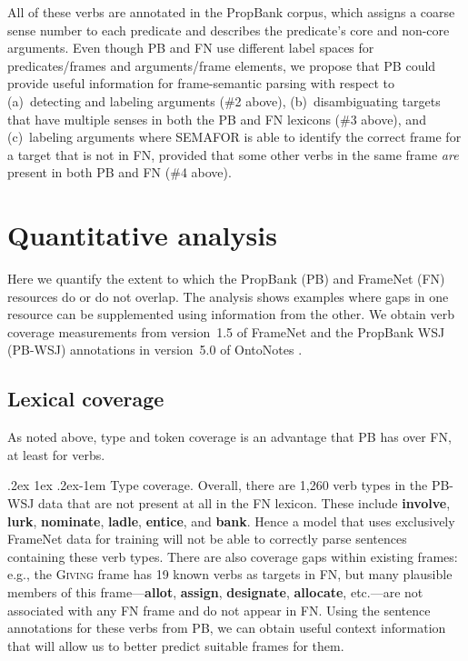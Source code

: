 \documentclass[11pt]{article}
\makeatletter
\renewcommand{\paragraph}{%
  \@startsection{paragraph}{4}%
  {\z@}{.2ex \@plus 1ex \@minus .2ex}{-1em}%
  {\normalfont\normalsize\bfseries}%
}
\newcommand{\vpred}[1]{\textbf{#1}} %
\newcommand{\fname}[1]{\textsc{#1}} %
\makeatother
\begin{document}
All of these verbs are annotated in the PropBank corpus, which assigns a coarse sense number 
to each predicate and describes the predicate's core and non-core arguments. 
Even though PB and FN use different label spaces for predicates/frames and 
arguments/frame elements, we propose that PB could provide useful information for frame-semantic parsing 
with respect to (a)~detecting and labeling arguments (\#2 above),  
(b)~disambiguating targets that have multiple senses in both the PB and FN lexicons (\#3 above), and
(c)~labeling arguments where SEMAFOR is able to identify the correct frame for a target that is not in FN, 
provided that some other verbs in the same frame \emph{are} present in both PB and FN (\#4 above).


\section{Quantitative analysis}\label{sec:quant}

Here we quantify the extent to which the PropBank (PB) and FrameNet (FN) resources 
do or do not overlap. The analysis shows examples where gaps in one resource can be supplemented using information from the other. We obtain verb coverage measurements from version~1.5 of FrameNet 
and the PropBank WSJ (PB-WSJ) annotations in version~5.0 of OntoNotes \citep{ontonotes}. 

\subsection{Lexical coverage}\label{sec:coverage}


As noted above, type and token coverage is an advantage that PB has over FN, at least for verbs.

\paragraph{Type coverage.}
Overall, there are 1,260 verb types in the PB-WSJ data that are not present at all in the FN lexicon. 
These include \vpred{involve}, \vpred{lurk}, \vpred{nominate}, \vpred{ladle}, \vpred{entice}, and \vpred{bank}.
Hence a model that uses exclusively FrameNet data for training will not be able to correctly parse sentences 
containing these verb types.
There are also coverage gaps within existing frames: e.g., the \fname{Giving} frame has 19 known verbs as targets in FN, but  
many plausible members of this frame---\vpred{allot}, \vpred{assign}, \vpred{designate}, \vpred{allocate}, etc.---are not associated with any FN frame and do not appear in FN. Using the sentence annotations for these verbs from PB, we can obtain useful context information that will allow us to better predict suitable frames for them.
\end{document}
